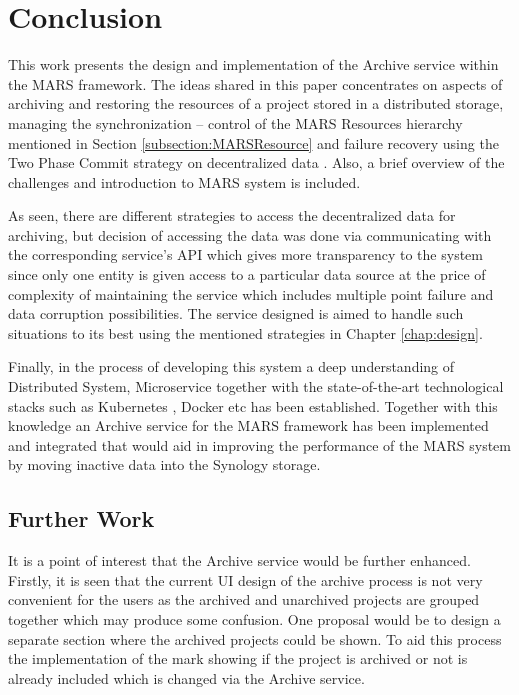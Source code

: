 \chapter{Conclusion}
This work presents the design and implementation of the Archive service within the MARS framework. The ideas shared
in this paper concentrates on aspects of archiving and restoring the resources of a project stored in a distributed storage, managing the synchronization
-- control of the MARS Resources hierarchy mentioned in Section \ref{subsection:MARSResource} and failure recovery using the Two Phase Commit strategy
on decentralized data \cite{atomic}.
Also, a brief overview of the challenges and introduction to MARS system is included.

As seen, there are different strategies to access the decentralized data for archiving, but decision of accessing the data was done via communicating
with the corresponding service's API which gives more transparency to the system since only one entity is given access to a particular data source at the price of 
complexity of maintaining the service which includes multiple point failure and data corruption possibilities. The service designed is aimed to handle such situations
to its best using the mentioned strategies in Chapter \ref{chap:design}.

Finally, in the process of developing this system a deep understanding of Distributed System, Microservice together with the state-of-the-art technological stacks
such as Kubernetes \cite{kubernetes}, Docker etc has been established. Together with this knowledge an Archive service for the MARS framework has been implemented and integrated 
that would aid in improving the performance of the MARS system by moving inactive data into the Synology storage.

\section{Further Work}
It is a point of interest that the Archive service would be further enhanced. Firstly, it is seen that the current UI design of the archive process is not very convenient
for the users as the archived and unarchived projects are grouped together which may produce some confusion. One proposal would be to design a separate section
where the archived projects could be shown. To aid this process the implementation of the mark showing if the project is archived or not is already included which is
changed via the Archive service. 

